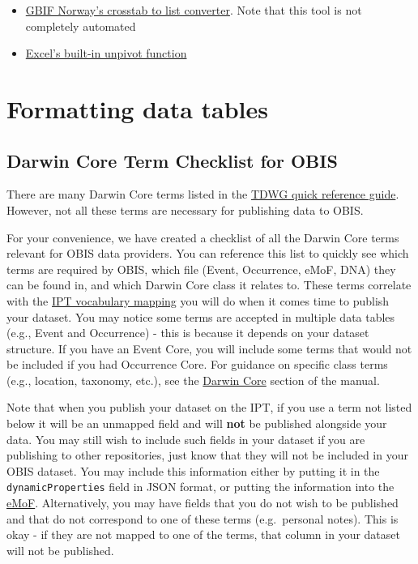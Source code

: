 \documentclass[
  letterpaper,
  DIV=11,
  numbers=noendperiod,
  oneside]{scrreprt}
\providecommand{\tightlist}{%
  \setlength{\itemsep}{0pt}\setlength{\parskip}{0pt}}\usepackage{longtable,booktabs,array}
\begin{document}
\begin{itemize}
\tightlist
\item
  \href{https://gbif-norway.github.io/crosstab2list/}{GBIF Norway's
  crosstab to list converter}. Note that this tool is not completely
  automated
\item
  \href{https://www.excel-university.com/unpivot-excel-data/}{Excel's
  built-in unpivot function}
\end{itemize}

\hypertarget{formatting-data-tables}{%
\chapter{Formatting data tables}\label{formatting-data-tables}}

\hypertarget{darwin-core-term-checklist-for-obis}{%
\section{Darwin Core Term Checklist for
OBIS}\label{darwin-core-term-checklist-for-obis}}

There are many Darwin Core terms listed in the
\href{https://dwc.tdwg.org/terms/}{TDWG quick reference guide}. However,
not all these terms are necessary for publishing data to OBIS.

For your convenience, we have created a checklist of all the Darwin Core
terms relevant for OBIS data providers. You can reference this list to
quickly see which terms are required by OBIS, which file (Event,
Occurrence, eMoF, DNA) they can be found in, and which Darwin Core class
it relates to. These terms correlate with the
\protect\hyperlink{map-your-data-to-darwin-core}{IPT vocabulary mapping}
you will do when it comes time to publish your dataset. You may notice
some terms are accepted in multiple data tables (e.g., Event and
Occurrence) - this is because it depends on your dataset structure. If
you have an Event Core, you will include some terms that would not be
included if you had Occurrence Core. For guidance on specific class
terms (e.g., location, taxonomy, etc.), see the
\protect\hyperlink{darwin-core-guidelines}{Darwin Core} section of the
manual.

Note that when you publish your dataset on the IPT, if you use a term
not listed below it will be an unmapped field and will \textbf{not} be
published alongside your data. You may still wish to include such fields
in your dataset if you are publishing to other repositories, just know
that they will not be included in your OBIS dataset. You may include
this information either by putting it in the \texttt{dynamicProperties}
field in JSON format, or putting the information into the
\href{format_emof.html}{eMoF}. Alternatively, you may have fields that
you do not wish to be published and that do not correspond to one of
these terms (e.g.~personal notes). This is okay - if they are not mapped
to one of the terms, that column in your dataset will not be published.
\end{document}
